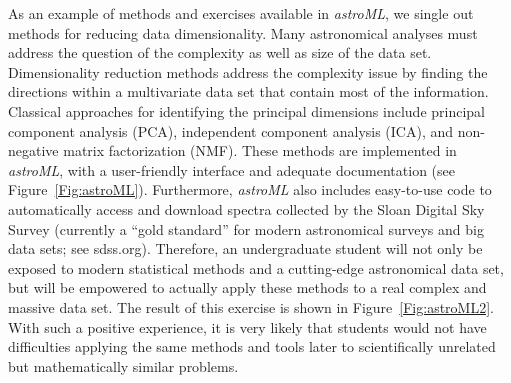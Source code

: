 As an example of methods and exercises available in  {\it astroML}, we single out methods 
for reducing data dimensionality. Many astronomical analyses must address the question of the 
complexity as well as size of the data set. Dimensionality reduction methods address the
complexity issue  by finding the directions within a multivariate data set that contain most 
of the information. Classical approaches for identifying the principal dimensions include
principal component analysis (PCA), independent component analysis (ICA), and non-negative 
matrix factorization (NMF). These methods are implemented in   {\it astroML}, with a user-friendly 
interface and adequate documentation (see Figure~\ref{Fig:astroML}). Furthermore, {\it astroML} also 
includes easy-to-use code to automatically access and download spectra collected by the Sloan Digital 
Sky Survey (currently a ``gold standard'' for modern astronomical surveys and big data sets; see sdss.org). 
Therefore, an undergraduate student will not only be exposed to modern statistical methods
and a cutting-edge astronomical data set, but will be empowered to actually apply these methods 
to a real complex and massive data set.  The result of this exercise is shown in Figure~\ref{Fig:astroML2}. 
With such a positive experience, it is very likely that students would not have difficulties applying 
the same methods and tools later to scientifically unrelated but mathematically similar problems.  


